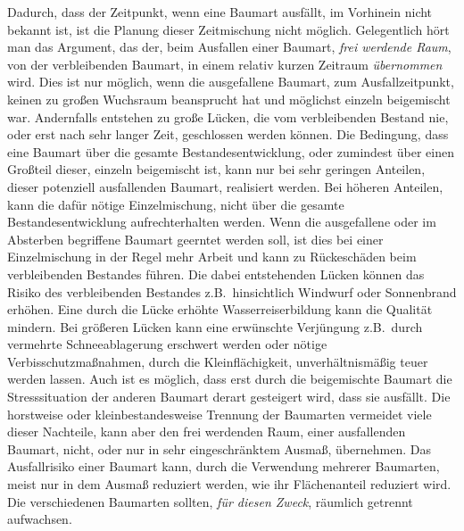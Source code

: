 \documentclass[twocolumn]{scrartcl}
\begin{document}
Dadurch, dass der Zeitpunkt, wenn eine Baumart ausfällt, im Vorhinein nicht
bekannt ist, ist die Planung dieser Zeitmischung nicht möglich. Gelegentlich
hört man das Argument, das der, beim Ausfallen einer Baumart, \emph{frei
werdende Raum}, von der verbleibenden Baumart, in einem relativ kurzen Zeitraum
\emph{übernommen} wird. Dies ist nur möglich, wenn die ausgefallene Baumart, zum
Ausfallzeitpunkt, keinen zu großen Wuchsraum beansprucht hat und möglichst
einzeln beigemischt war. Andernfalls entstehen zu große Lücken, die vom
verbleibenden Bestand nie, oder erst nach sehr langer Zeit, geschlossen werden
können. Die Bedingung, dass eine Baumart über die gesamte Bestandesentwicklung,
oder zumindest über einen Großteil dieser, einzeln beigemischt ist, kann nur bei
sehr geringen Anteilen, dieser potenziell ausfallenden Baumart, realisiert
werden. Bei höheren Anteilen, kann die dafür nötige Einzelmischung, nicht über
die gesamte Bestandesentwicklung aufrechterhalten werden. Wenn die ausgefallene
oder im Absterben begriffene Baumart geerntet werden soll, ist dies bei einer
Einzelmischung in der Regel mehr Arbeit und kann zu Rückeschäden beim
verbleibenden Bestandes führen. Die dabei entstehenden Lücken können das Risiko
des verbleibenden Bestandes z.B.\ hinsichtlich Windwurf oder Sonnenbrand
erhöhen. Eine durch die Lücke erhöhte Wasserreiserbildung kann die Qualität
mindern. Bei größeren Lücken kann eine erwünschte Verjüngung z.B.\ durch
vermehrte Schneeablagerung erschwert werden oder nötige Verbisschutzmaßnahmen,
durch die Kleinflächigkeit, unverhältnismäßig teuer werden lassen. Auch ist es
möglich, dass erst durch die beigemischte Baumart die Stresssituation der
anderen Baumart derart gesteigert wird, dass sie ausfällt. Die horstweise oder
kleinbestandesweise Trennung der Baumarten vermeidet viele dieser Nachteile,
kann aber den frei werdenden Raum, einer ausfallenden Baumart, nicht, oder nur
in sehr eingeschränktem Ausmaß, übernehmen. Das Ausfallrisiko einer Baumart
kann, durch die Verwendung mehrerer Baumarten, meist nur in dem Ausmaß reduziert
werden, wie ihr Flächenanteil reduziert wird. Die verschiedenen Baumarten
sollten, \emph{für diesen Zweck}, räumlich getrennt aufwachsen.
\end{document}
